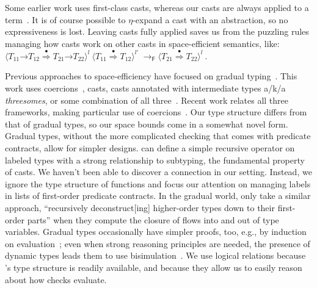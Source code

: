 \documentclass[9pt]{extarticle}
\newcommand{\ottnt}[1]{\mathit{#1}}
\begin{document}
Some earlier work uses first-class casts, whereas our casts are always
applied to a term~\cite{Belo11fh,Knowles10hybrid}. It is of course
possible to $\eta$-expand a cast with an abstraction, so no
expressiveness is lost. Leaving casts fully applied saves us from the
puzzling rules managing how casts work on other casts in
space-efficient semantics, like:
$ \langle   \ottnt{T_{{\mathrm{11}}}} \mathord{ \rightarrow } \ottnt{T_{{\mathrm{12}}}}   \mathord{ \overset{\bullet}{\Rightarrow} }   \ottnt{T_{{\mathrm{21}}}} \mathord{ \rightarrow } \ottnt{T_{{\mathrm{22}}}}   \rangle^{ \ottnt{l} } ~   \langle  \ottnt{T_{{\mathrm{11}}}}  \mathord{ \overset{\bullet}{\Rightarrow} }  \ottnt{T_{{\mathrm{12}}}}  \rangle^{ \ottnt{l'} } ~      \!\!  \longrightarrow _{  \mathsf{F}  }   \langle  \ottnt{T_{{\mathrm{21}}}}  \mathord{ \overset{\bullet}{\Rightarrow} }  \ottnt{T_{{\mathrm{22}}}}  \rangle^{ \ottnt{l} } ~     $\!\!.

Previous approaches to space-efficiency have focused on gradual
typing~\cite{Siek06gradual}. This work uses coercions~\cite{Henglein94dynamic},
casts, casts annotated with intermediate types a/k/a
\textit{threesomes}, or some combination of all
three~\cite{Siek09casts, Siek10threesomes, Herman10space,
  Siek12interpretations, Garcia13threesomes}. Recent work relates all
three frameworks, making particular use of
coercions~\cite{Siek15coercions}.
Our type structure differs from that of gradual types, so our space
bounds come in a somewhat novel form.
Gradual types, without the more complicated checking that comes with
predicate contracts, allow for simpler
designs.  can define a simple recursive
operator on labeled types with a strong relationship to subtyping, the
fundamental property of casts. We haven't been able to discover a
connection in our setting. Instead, we ignore the type structure of
functions and focus our attention on managing labels in lists
of first-order predicate contracts.
In the gradual world, only  take a similar
approach, ``recursively deconstruct[ing] higher-order types down to
their first-order parts'' when they compute the closure of flows into
and out of type variables.
Gradual types occasionally have simpler proofs, too, e.g., by
induction on evaluation~\cite{Siek09casts}; even when strong reasoning
principles are needed, the presence of dynamic types leads them to use
bisimulation~\cite{Siek10threesomes,Garcia13threesomes,Siek15coercions}.
We use logical relations because \lambdah's type structure is readily
available, and because they allow us to easily reason about how checks
evaluate.
\end{document}
